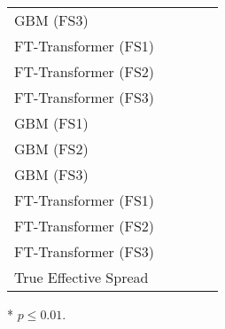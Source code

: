 \begin{threeparttable}
\begin{tabular}{lSSSS}
        \gls{GBM} (FS3)       &                                                         & \tnote{*}                                                &               & \tnote{*}     \\
        FT-Transformer (FS1)  &                                                         & \tnote{*}                                                &               & \tnote{*}     \\
        FT-Transformer (FS2)  &                                                         & \tnote{*}                                                &               & \tnote{*}     \\
        FT-Transformer (FS3)  &                                                         & \tnote{*}                                                &               & \tnote{*}     \\ \midrule
        \gls{GBM} (FS1)       &                                                         & \tnote{*}                                                &               & \tnote{*}     \\
        \gls{GBM} (FS2)       &                                                         & \tnote{*}                                                &               & \tnote{*}     \\
        \gls{GBM} (FS3)       &                                                         & \tnote{*}                                                &               & \tnote{*}     \\
        FT-Transformer (FS1)  &                                                         & \tnote{*}                                                &               & \tnote{*}     \\
        FT-Transformer (FS2)  &                                                         & \tnote{*}                                                &               & \tnote{*}     \\
        FT-Transformer (FS3)  &                                                         & \tnote{*}                                                &               & \tnote{*}     \\ \midrule
        True Effective Spread &                                                         & \tnote{*}                                                &               & \tnote{*}     \\ \bottomrule
    \end{tabular}
    \begin{tablenotes}\footnotesize
        \item[*] $p \leq 0.01$.
    \end{tablenotes}
\end{threeparttable}